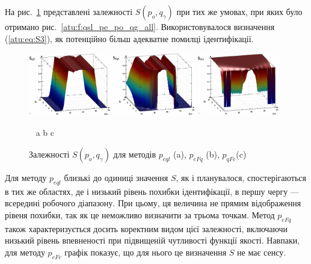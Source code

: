 \documentclass[a4paper,13pt]{atuaref}
\begin{document}
На рис.~\ref{atu:f:qsl_S_po_qg_all} представлені залежності
$S (p_o, q_\gamma)$
при тих же умовах, при яких було отримано рис.~\ref{atu:f:qsl_pe_po_qg_all}.
Використовувалося визначення (\ref{atu:eq:S3}), як
потенційно більш адекватне помилці ідентифікації.

\begin{figure}[htb!]
  \centerline{
    \includegraphics[width=0.32\textwidth]{p3/p/qls_pe-p_po_qg_Sql_all_xl.png}
    \hfill
    \includegraphics[width=0.32\textwidth]{p3/p/qls_pe-p_po_qg_SFq_all_xl.png}
    \hfill
    \includegraphics[width=0.32\textwidth]{p3/p/qls_pe-p_po_qg_SFc_all_xl.png}
  }
  \vspace{-1.5ex}
  \begin{center}
    ~ \hfill a \hfill\hfill b \hfill\hfill c \hfill ~
  \end{center}
  \vspace{-2.5ex}
  \caption{Залежності $S(p_o,q_\gamma)$ для методів $p_{eql}$ (a), $p_{eFq}$ (b), $p_{qFc}$(c)}
  \label{atu:f:qsl_S_po_qg_all}
\end{figure}

Для методу $p_{eql}$ близькі до одиниці значення $S$, як і планувалося,
спостерігаються в тих же областях, де і низький рівень похибки ідентифікації, в
першу чергу --- всередині робочого діапазону. При цьому, ця величина не
прямим відображення рівеня похибки, так як це неможливо визначити за трьома точкам.
Метод $p_{eFq}$ також характеризується досить коректним видом цієї залежності,
включаючи низький рівень впевненості при підвищеній чутливості функції якості.
Навпаки, для методу $p_{eFc}$ графік показує, що для нього це визначення $ S$ не має сенсу.
\end{document}
